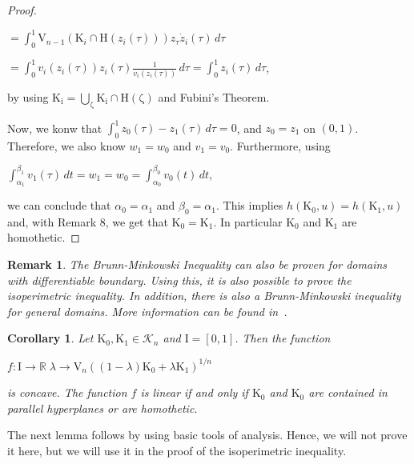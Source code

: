 \documentclass[a4paper]{book}
\newtheorem{remark}[theorem]{Remark}%
\newtheorem{corollary}[theorem]{Corollary}%
\numberwithin{theorem}{section}%
\begin{document}
\begin{proof}
\begin{center}
        $\displaystyle =\int_{0}^{1}\mathrm{V}_{n-1}(\mathrm{K}_{i}\cap\mathrm{H}(z_{i}(\tau)))z_{\tau}\dot{z}_{i}(\tau)\,d\tau$







        $\displaystyle =\int_{0}^{1}v_{i}(z_{i}(\tau))z_{i}(\tau)\frac{1}{v_{i}(z_{i}(\tau))}\,d\tau=\int_{0}^{1}z_{i}(\tau)\,d\tau$,
    \end{center}
    by using $\mathrm{K_{i}=\bigcup_{\zeta}\mathrm{K}_{i}\cap\mathrm{H}(\zeta)}$ and Fubini's Theorem.

    Now, we konw that $\int_{0}^{1}z_{0}(\tau)-z_{1}(\tau)\,d\tau=0$, and $z_{0}=z_{1}$ on $(0,1)$. Therefore, we also know $w_{1}=w_{0}$ and $v_{1}=v_{0}$. Furthermore, using
    \begin{center}
        $\int_{\alpha_{1}}^{\beta_{1}}v_{1}(\tau)\,dt=w_{1}=w_{0}=\int_{\alpha_{0}}^{\beta_{0}}v_{0}(t)\,dt$,
    \end{center}
    we can conclude that $\alpha_{0}=\alpha_{1}$ and $\beta_{0}=\alpha_{1}$. This implies $h(\mathrm{K}_{0},u)=h(\mathrm{K}_{1},u)$ and, with Remark 8, we get that $\mathrm{K}_{0}=\mathrm{K}_{1}$. In particular $\mathrm{K}_{0}$ and $\mathrm{K}_{1}$ are homothetic.
\end{proof}

\begin{remark}
    The Brunn-Minkowski Inequality can also be proven for domains with differentiable boundary. Using this, it is also possible to prove the isoperimetric inequality. In addition, there is also a Brunn-Minkowski inequality for general domains. More information can be found in~\citep{gardner2002brunn}.
\end{remark}

\begin{corollary}
    Let $\mathrm{K}_{0}, \mathrm{K}_{1}\in\mathscr{K}_{n}$ and $\mathrm{I}=[0,1]$. Then the function
    \begin{center}
        $f:\mathrm{I}\to\mathbb{R}\;\lambda\to\mathrm{V}_{n}((1-\lambda)\mathrm{K}_{0}+\lambda\mathrm{K}_{1})^{1/n}$
    \end{center}
    is concave. The function $f$ is linear if and only if $\mathrm{K}_{0}$ and $\mathrm{K}_{0}$ are contained in parallel hyperplanes or are homothetic.
\end{corollary}

The next lemma follows by using basic tools of analysis. Hence, we will not prove it here, but we will use it in the proof of the isoperimetric inequality.
\end{document}
